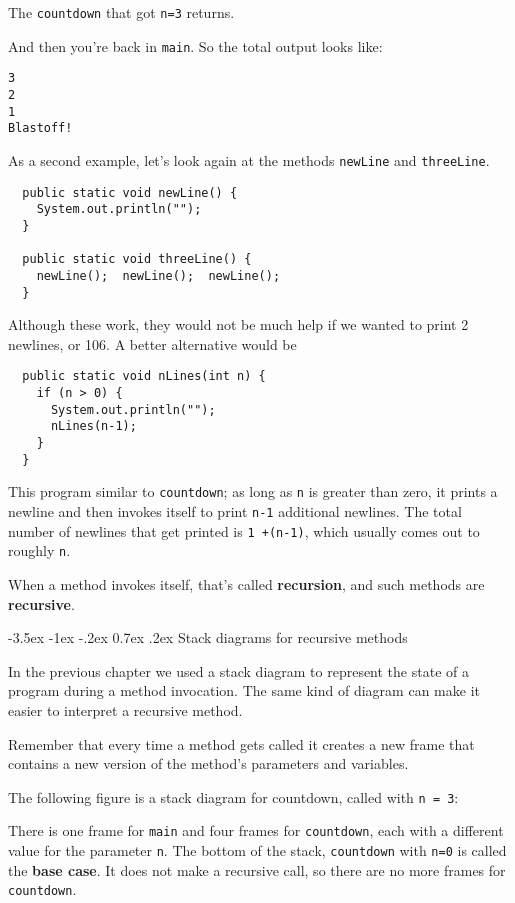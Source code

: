 \documentclass{book}
\makeatletter
\renewcommand{\section}{\@startsection 
    {section} {1} {0mm}%
    {-3.5ex \@plus -1ex \@minus -.2ex}%
    {0.7ex \@plus.2ex}%
    {\normalfont\Large\bfseries}}
\newcommand{\beforefig}{\vspace{1.3\parskip}}
\newcommand{\afterfig}{\vspace{-0.2\parskip}}
\newcommand{\myfig}[1]{
    \beforefig
    \centerline{\epsfig{#1,scale=0.8}}
    \afterfig
}
\makeatother
\begin{document}
The {\tt countdown} that got {\tt n=3} returns.

\noindent And then you're back in {\tt main}.  So the
total output looks like:

\begin{verbatim}
3
2
1
Blastoff!
\end{verbatim}
%
As a second example, let's look again at the methods
{\tt newLine} and {\tt threeLine}.

\begin{verbatim}
  public static void newLine() {
    System.out.println("");
  }

  public static void threeLine() {
    newLine();  newLine();  newLine();
  }
\end{verbatim}
%
Although these work, they would not be much help if we wanted
to print 2 newlines, or 106.  A better alternative would be

\begin{verbatim}
  public static void nLines(int n) {
    if (n > 0) {
      System.out.println("");
      nLines(n-1);
    }
  }
\end{verbatim}
%
This program similar to {\tt countdown}; as long as {\tt n} is greater
than zero, it prints a newline and then invokes itself to
print {\tt n-1} additional newlines.  The total number
of newlines that get printed is {\tt 1 +(n-1)}, which usually
comes out to roughly {\tt n}.


When a method invokes itself, that's called {\bf recursion}, and
such methods are {\bf recursive}.


\section {Stack diagrams for recursive methods}

In the previous chapter we used a stack diagram to represent the
state of a program during a method invocation.  The same kind
of diagram can make it easier to interpret a recursive method.

Remember that every time a method gets called it creates
a new frame that contains a new version of
the method's parameters and variables.

The following figure is a stack diagram for countdown, called
with {\tt n = 3}:

\myfig{figure=figs/stack2.eps}
% 
There is one frame for {\tt main} and four frames for {\tt countdown},
each with a different value for the parameter {\tt n}.  The bottom of
the stack, {\tt countdown} with {\tt n=0} is called the {\bf base
  case}.  It does not make a recursive call, so there are no more
frames for {\tt countdown}.
\end{document}

